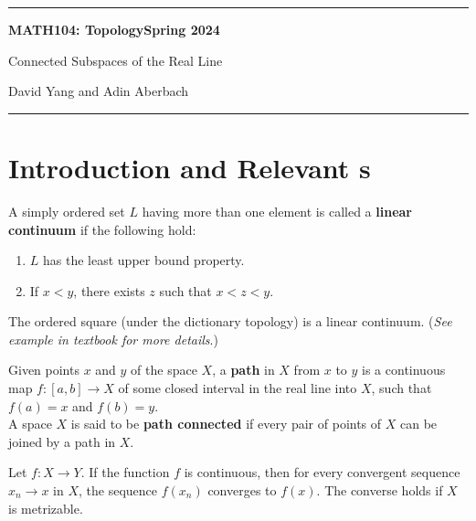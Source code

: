 \documentclass[11pt]{article}
\begin{document}
	\hrule
	\begin{center}
        \textbf{MATH104: Topology}\hfill \textbf{Spring 2024}\newline

		{\Large Connected Subspaces of the Real Line}

		David Yang and Adin Aberbach
	\end{center}

\hrule

\vspace{1em}

\section{Introduction and Relevant s}

\begin{definition*}
A simply ordered set $L$ having more than one element is called a
\textbf{linear continuum} if the following hold:
\begin{enumerate}
    \item $L$ has the least upper bound property.
    \item If $x < y$, there exists $z$ such that $x < z < y$.
\end{enumerate}
\end{definition*}

\begin{eg}[1, page 155]
The ordered square (under the dictionary topology) is a linear continuum. (\textit{See example in textbook for more details}.)
\end{eg}

\begin{definition*}
Given points $x$ and $y$ of the space $X$, a \textbf{path} in $X$ from $x$ to $y$
is a continuous map $f\colon [a, b] \rightarrow X$ of some closed interval in the real line into $X$, such
that $f(a) = x$ and $f(b) = y$. \\

\noindent A space $X$ is said to be \textbf{path connected} if every pair of points of $X$ can be joined by a path in $X$.
\end{definition*}

\begin{theorem*}[21.3, page 130]
Let $f\colon X\rightarrow Y$. If the function $f$ is continuous, then for every convergent sequence $x_n \rightarrow x$ in $X$, the sequence $f(x_n)$ converges to $f(x)$. 
The converse holds if $X$ is metrizable.
\end{theorem*}
\end{document}
